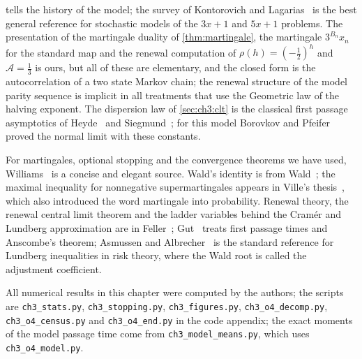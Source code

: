  tells the history of the model; the survey of Kontorovich and Lagarias~\cite{kontorovich2009} is the best general reference for stochastic models of the $3x+1$ and $5x+1$ problems. The presentation of
the martingale
duality of \cref{thm:martingale}, the martingale $3^{B_n}x_n$ for the standard
map and the renewal computation of $\rho(h)=(-\tfrac12)^h$ and $\mathcal{A}=\frac13$
is ours, but all of these are elementary, and the closed form is the
autocorrelation of a two state Markov chain; the renewal structure of the model parity
sequence is implicit in all treatments that use the Geometric law of the
halving exponent. The dispersion law of \cref{sec:ch3:clt} is the classical
first passage asymptotics of Heyde~\cite{heyde1967} and
Siegmund~\cite{siegmund1969}; for this model
Borovkov and Pfeifer~\cite[Theorem~5]{borovkov2001}
proved the normal limit with these constants.

For martingales, optional stopping and the convergence theorems we have used,
Williams~\cite{williams1991} is a concise and elegant source. Wald's identity
is from Wald~\cite{wald1944}; the maximal inequality for nonnegative
supermartingales appears in Ville's thesis~\cite{ville1939}, which also
introduced the word martingale into probability. Renewal theory, the renewal
central limit theorem and the ladder variables behind the Cram\'er and Lundberg
approximation are in Feller~\cite{feller1971}; Gut~\cite{gut1988} treats
first passage times and Anscombe's theorem; Asmussen and
Albrecher~\cite{asmussen2010} is the standard reference for Lundberg
inequalities in risk theory, where the Wald root is called the adjustment
coefficient.

\begin{sloppypar}
All numerical results in this chapter were computed by the authors; the scripts
are \texttt{ch3\_stats.py}, \texttt{ch3\_stopping.py},
\texttt{ch3\_figures.py}, \texttt{ch3\_o4\_decomp.py}, \texttt{ch3\_o4\_census.py} and \texttt{ch3\_o4\_end.py} in the code appendix; the exact moments of the model passage time come from \texttt{ch3\_model\_means.py}, which uses \texttt{ch3\_o4\_model.py}.
\end{sloppypar}

